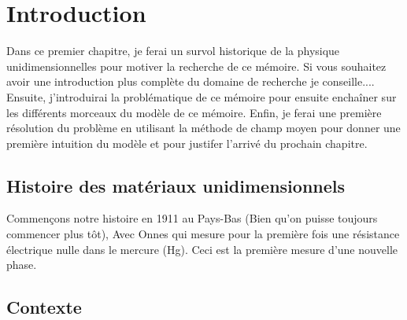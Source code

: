 \chapter{Introduction}

\begin{Abstract}
    \begin{changemargin}{2cm}{2cm}
    Dans ce premier chapitre, je ferai un survol historique de la physique
    unidimensionnelles pour motiver la recherche de ce mémoire. Si vous
    souhaitez avoir une introduction plus complète du domaine de recherche je
    conseille.... Ensuite, j'introduirai la problématique de ce mémoire pour
    ensuite enchaîner sur les différents morceaux du modèle de ce mémoire.
    Enfin, je ferai une première résolution du problème en utilisant la
    méthode de champ moyen pour donner une première intuition du modèle et
    pour justifer l'arrivé du prochain chapitre.
    \end{changemargin}
\end{Abstract}

\section{Histoire des matériaux unidimensionnels}
Commençons notre histoire en 1911 au Pays-Bas (Bien qu'on puisse toujours
commencer plus tôt), Avec Onnes qui mesure pour la première fois une
résistance électrique nulle dans le mercure (Hg). Ceci est la première
mesure d'une nouvelle phase.

\section{Contexte}

